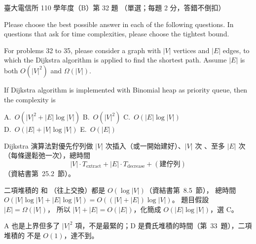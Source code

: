 \begin{pastexam}[label={px:ntu-110-comm-dsa-32}]{臺大電信所 110 學年度（B）第 32 題}
（單選；每題 2 分，答錯不倒扣）

Please choose the best possible answer in each of the following questions. In questions that ask for time complexities, please choose the tightest bound.

For problems 32 to 35, please consider a graph with $|V|$ vertices and $|E|$ edges, to which the Dijkstra algorithm is applied to find the shortest path. Assume $|E|$ is both $O(|V|^2)$ and $\Omega(|V|)$.

If Dijkstra algorithm is implemented with Binomial heap as priority queue, then the complexity is

A.~$O(|V|^2+|E|\log|V|)$ \qquad B.~$O(|V|^2)$ \qquad C.~$O(|E|\log|V|)$\\
D.~$O(|E|+|V|\log|V|)$ \qquad E.~$O(|E|)$
\end{pastexam}

\begin{pastsoln}
Dijkstra 演算法對優先佇列做 $|V|$ 次插入（或一開始建好）、$|V|$ 次 、至多 $|E|$ 次
（每條邊鬆弛一次），總時間
\[
|V| \cdot T_{\text{extract}} + |E| \cdot T_{\text{decrease}} + (\text{建佇列})
\]
（資結書第~25.2~節）。

二項堆積的  和 （往上交換）都是 $O(\log|V|)$（資結書第~8.5~節），
總時間 $O(|V|\log|V| + |E|\log|V|) = O((|V| + |E|)\log|V|)$。 題目假設 $|E| = \Omega(|V|)$，
所以 $|V| + |E| = O(|E|)$，化簡成 $O(|E|\log|V|)$，選 C。

A 也是上界但多了 $|V|^2$ 項，不是最緊的；D 是費氏堆積的時間（第~33~題），二項堆積的
 不是 $O(1)$，達不到。
\end{pastsoln}

